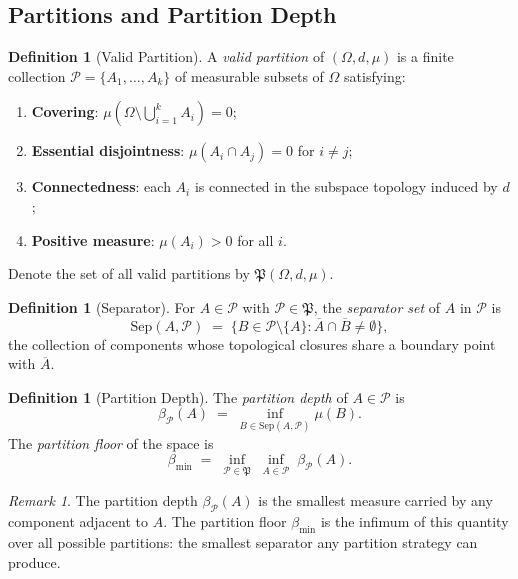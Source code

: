 \documentclass[12pt,a4paper,twocolumn]{article}
\theoremstyle{plain}
\theoremstyle{definition}
\newtheorem{definition}[theorem]{Definition}
\theoremstyle{remark}
\newtheorem{remark}[theorem]{Remark}
\newcommand{\Part}{\mathcal{P}}
\newcommand{\Sep}{\mathrm{Sep}}
\newcommand{\bmin}{\beta_{\min}}
\newcommand{\bP}{\beta_{\mathcal{P}}}
\newcommand{\BRS}{(\Omega,d,\mu)}
\begin{document}
\subsection{Partitions and Partition Depth}

\begin{definition}[Valid Partition]
\label{def:partition}
A \emph{valid partition} of $\BRS$ is a finite collection
$\Part = \{A_1, \ldots, A_k\}$ of measurable subsets of $\Omega$ satisfying:
\begin{enumerate}[label=(\roman*)]
  \item \textbf{Covering}: $\mu\!\left(\Omega \setminus \bigcup_{i=1}^k A_i\right) = 0$;
  \item \textbf{Essential disjointness}: $\mu(A_i \cap A_j) = 0$ for $i \neq j$;
  \item \textbf{Connectedness}: each $A_i$ is connected in the subspace
    topology induced by $d$;
  \item \textbf{Positive measure}: $\mu(A_i) > 0$ for all $i$.
\end{enumerate}
Denote the set of all valid partitions by $\mathfrak{P}(\Omega,d,\mu)$.
\end{definition}

\begin{definition}[Separator]
\label{def:separator}
For $A \in \Part$ with $\Part \in \mathfrak{P}$, the \emph{separator set}
of $A$ in $\Part$ is
\begin{equation}
  \Sep(A, \Part) \;=\; \bigl\{ B \in \Part \setminus \{A\}
    : \overline{A} \cap \overline{B} \neq \emptyset \bigr\},
\end{equation}
the collection of components whose topological closures share a boundary
point with $\overline{A}$.
\end{definition}

\begin{definition}[Partition Depth]
\label{def:partition-depth}
The \emph{partition depth} of $A \in \Part$ is
\begin{equation}
  \bP(A) \;=\; \inf_{B \in \Sep(A,\Part)} \mu(B).
\end{equation}
The \emph{partition floor} of the space is
\begin{equation}
  \bmin \;=\; \inf_{\Part \in \mathfrak{P}}\; \inf_{A \in \Part}\; \bP(A).
\end{equation}
\end{definition}

\begin{remark}
The partition depth $\bP(A)$ is the smallest measure carried by any component
adjacent to $A$.  The partition floor $\bmin$ is the infimum of this quantity
over all possible partitions: the smallest separator any partition strategy
can produce.
\end{remark}
\end{document}
